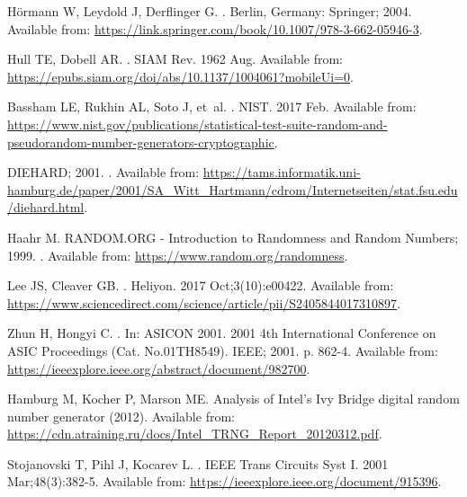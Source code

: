 \documentclass[]{interact}
\theoremstyle{plain}%
\theoremstyle{definition}
\theoremstyle{remark}
\begin{document}
\begin{thebibliography}{100}
H{\ifmmode{}\else\"{o}\fi}rmann W, Leydold J, Derflinger G.
.
\newblock Berlin, Germany: Springer; 2004.
\newblock Available from:
  \url{https://link.springer.com/book/10.1007/978-3-662-05946-3}.

Hull TE, Dobell AR.
.
\newblock SIAM Rev. 1962 Aug.
\newblock Available from:
  \url{https://epubs.siam.org/doi/abs/10.1137/1004061?mobileUi=0}.

Bassham LE, Rukhin AL, Soto J, et~al.
.
\newblock NIST. 2017 Feb.
\newblock Available from:
  \url{https://www.nist.gov/publications/statistical-test-suite-random-and-pseudorandom-number-generators-cryptographic}.

{DIEHARD}; 2001.
.
\newblock Available from:
  \url{https://tams.informatik.uni-hamburg.de/paper/2001/SA_Witt_Hartmann/cdrom/Internetseiten/stat.fsu.edu/diehard.html}.

Haahr M. {RANDOM.ORG - Introduction to Randomness and Random Numbers}; 1999.
.
\newblock Available from: \url{https://www.random.org/randomness}.

Lee JS, Cleaver GB.
.
\newblock Heliyon. 2017 Oct;3(10):e00422.
\newblock Available from:
  \url{https://www.sciencedirect.com/science/article/pii/S2405844017310897}.

Zhun H, Hongyi C.
.
\newblock In: {ASICON 2001. 2001 4th International Conference on ASIC
  Proceedings (Cat. No.01TH8549)}. IEEE; 2001. p. 862-4.
\newblock Available from:
  \url{https://ieeexplore.ieee.org/abstract/document/982700}.

Hamburg M, Kocher P, Marson ME.
\newblock Analysis of Intel’s Ivy Bridge digital random number generator
  (2012).
\newblock Available from:
  \url{https://cdn.atraining.ru/docs/Intel_TRNG_Report_20120312.pdf}.

Stojanovski T, Pihl J, Kocarev L.
.
\newblock IEEE Trans Circuits Syst I. 2001 Mar;48(3):382-5.
\newblock Available from: \url{https://ieeexplore.ieee.org/document/915396}.


\end{thebibliography}
\end{document}
